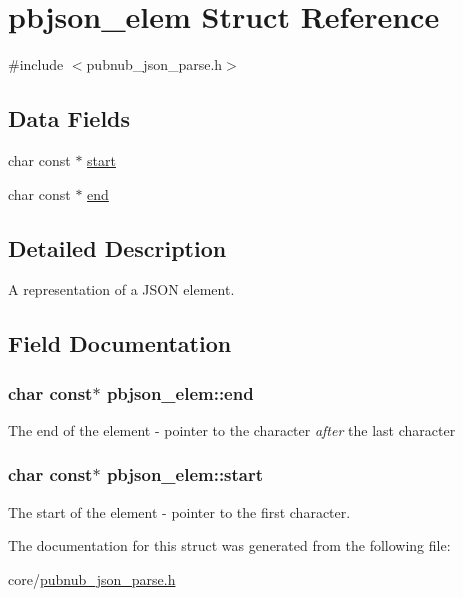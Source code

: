 \hypertarget{structpbjson__elem}{\section{pbjson\-\_\-elem Struct Reference}
\label{structpbjson__elem}
}


{\ttfamily \#include $<$pubnub\-\_\-json\-\_\-parse.\-h$>$}

\subsection*{Data Fields}
\begin{DoxyCompactItemize}
\item 
char const $\ast$ \hyperlink{structpbjson__elem_aafc88cd983d048f8aa2cfe4fa3b87945}{start}
\item 
char const $\ast$ \hyperlink{structpbjson__elem_a9e9f5569b0864d01b3884095a5cade53}{end}
\end{DoxyCompactItemize}


\subsection{Detailed Description}
A representation of a J\-S\-O\-N element. 

\subsection{Field Documentation}
\hypertarget{structpbjson__elem_a9e9f5569b0864d01b3884095a5cade53}{
\subsubsection[{end}]{\setlength{\rightskip}{0pt plus 5cm}char const$\ast$ pbjson\-\_\-elem\-::end}}\label{structpbjson__elem_a9e9f5569b0864d01b3884095a5cade53}
The end of the element -\/ pointer to the character {\itshape after} the last character \hypertarget{structpbjson__elem_aafc88cd983d048f8aa2cfe4fa3b87945}{
\subsubsection[{start}]{\setlength{\rightskip}{0pt plus 5cm}char const$\ast$ pbjson\-\_\-elem\-::start}}\label{structpbjson__elem_aafc88cd983d048f8aa2cfe4fa3b87945}
The start of the element -\/ pointer to the first character. 

The documentation for this struct was generated from the following file\-:\begin{DoxyCompactItemize}
\item 
core/\hyperlink{pubnub__json__parse_8h}{pubnub\-\_\-json\-\_\-parse.\-h}\end{DoxyCompactItemize}
